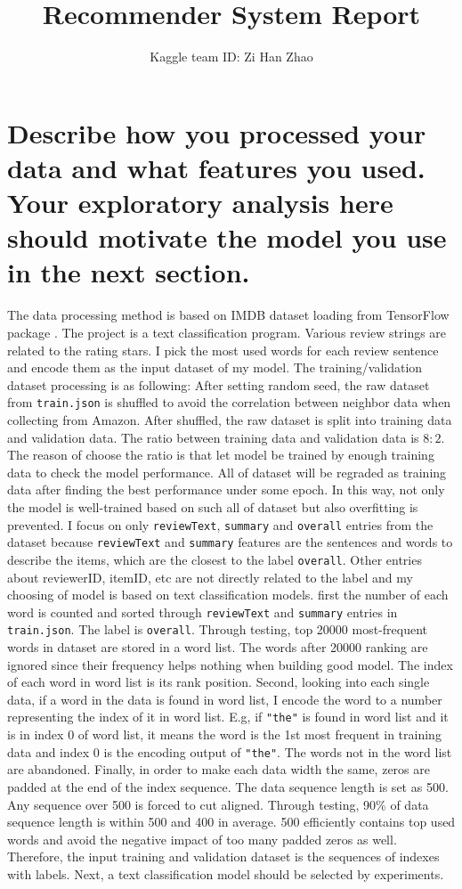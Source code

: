 \documentclass[12pt]{article}
\author{Kaggle team ID: Zi Han Zhao}
\affil{Student ID: zhaozih3}
\title{Recommender System Report}
\date{}
\begin{document}
\maketitle
\section{Describe how you processed your data and what features you used. Your exploratory analysis
here should motivate the model you use in the next section.}
The data processing method is based on IMDB dataset loading from TensorFlow package \cite{imdb}.
The project is a text classification program. Various review strings are related to the rating stars. 
I pick the most used words for each review sentence
and encode them as the input dataset of my model.
The training/validation dataset processing is as following: 
After setting random seed, the raw dataset from \texttt{train.json} is shuffled to 
avoid the correlation between neighbor data when collecting from Amazon.
After shuffled, the raw dataset is split into training data and validation data.
The ratio between training data and validation data is $8:2$.
The reason of choose the ratio is that let model be trained by enough training data
to check the model performance. All of dataset will be regraded as training data
after finding the best performance under some epoch. In this way, not only the model is well-trained
based on such all of dataset but also overfitting is prevented.
I focus on only \texttt{reviewText},
\texttt{summary} and \texttt{overall} entries from the dataset because \texttt{reviewText} and 
\texttt{summary} features are the sentences
and words to describe the items, which are the closest to the label \texttt{overall}. Other entries
about reviewerID, itemID, etc are not directly related to the label and my choosing of model is based
on text classification models.
first the number of each word is counted and sorted 
through \texttt{reviewText} and
\texttt{summary} entries in \texttt{train.json}. The label is \texttt{overall}. 
Through testing, top 20000 most-frequent words in dataset are stored in a word list.
The words after 20000 ranking are ignored since their frequency helps nothing when building
good model.
The index of each word in word list is its rank position.
Second, looking into each single data, if a word in the data is found in word list, I
encode the word to a number representing the index of it in word list. E.g, if \texttt{"the"} is found in word list
and it is in index 0 of word list, it means the word is the 1st most frequent in training data and index 0
is the encoding output of \texttt{"the"}. The words not in the word list are abandoned. Finally,
in order to make each data width the same, zeros are padded at the end of the index sequence. The data sequence
length is set as 500. Any sequence over 500 is forced to cut aligned.
Through testing, 90\% of data sequence length is within 500 and 400 in average.
500 efficiently contains top used words and avoid the negative impact of too many padded zeros as well.
Therefore, the input training and validation dataset is the sequences of indexes with labels.
Next, a text classification model should be selected by experiments.
\end{document}
